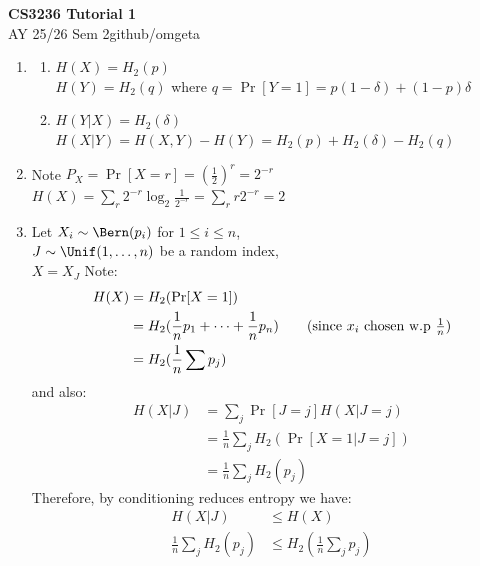 \documentclass[12pt, a4paper]{article}
\newcommand{\mytitle}{CS3236 Tutorial 1}
\newcommand{\myauthor}{github/omgeta}
\newcommand{\mydate}{AY 25/26 Sem 2}
\begin{document}
\raggedright
\footnotesize
\begin{center}
{\normalsize{\textbf{\mytitle}}} \\
{\footnotesize{\mydate\hspace{2pt}\textemdash\hspace{2pt}\myauthor}}
\end{center}
\begin{enumerate}[Q\arabic*.]
  \item 
    \begin{enumerate}
      \item $H(X) = H_2(p)$\\ 
        $H(Y) = H_2(q)$ where $q = \Pr[Y=1] = p(1-\delta) + (1-p)\delta$

      \item $H(Y|X) = H_2(\delta)$\\ 
        $H(X|Y) = H(X, Y) - H(Y) = H_2(p) + H_2(\delta) - H_2(q)$
    \end{enumerate}

  \item Note $P_X = \Pr[X=r] = (\frac{1}{2})^r = 2^{-r}$\\
    $H(X) = \sum_r 2^{-r} \log_2{\frac{1}{2^{-r}}} = \sum_r r2^{-r} = 2$

  \item Let $X_i \sim \Bern(p_i)$ for $1 \leq i \leq n$,\\
    $J \sim \Unif(1,\dots,n)$ be a random index,\\
    $X = X_J$
    Note:
    \begin{align*}
      H(X) &= H_2(\Pr[X=1])\\ 
           &= H_2(\frac{1}{n}p_1 + \dots + \frac{1}{n}p_n)\tag*{(since $x_i$ chosen w.p $\frac{1}{n}$)}\\ 
           &= H_2(\frac{1}{n} \sum p_j)
    \end{align*}
    and also:
    \begin{align*}
      H(X|J) &= \sum_j \Pr[J = j]H(X|J=j)\\ 
             &= \frac{1}{n}\sum_jH_2(\Pr[X=1|J=j])\\ 
             &= \frac{1}{n}\sum_j H_2(p_j)
    \end{align*}
    Therefore, by conditioning reduces entropy we have:
    \begin{align*}
      H(X|J) &\leq H(X)\\
      \frac{1}{n}\sum_j H_2(p_j) &\leq H_2(\frac{1}{n}\sum_j p_j)
    \end{align*} 


\end{enumerate}
\end{document}
